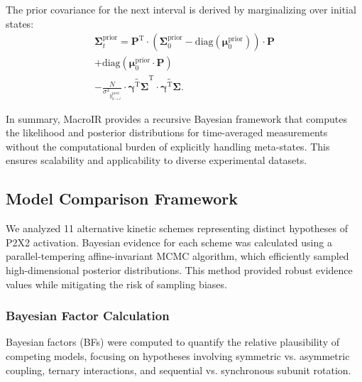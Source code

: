 \documentclass[pdflatex,sn-mathphys-num]{sn-jnl}%
\theoremstyle{thmstyleone}%
\theoremstyle{thmstyletwo}%
\theoremstyle{thmstylethree}%
\begin{document}
The prior covariance for the next interval is derived by marginalizing over initial states:
\begin{multline}
	\boldsymbol{\Sigma}^{\mathrm{prior}}_{t} = 
	\boldsymbol{P}^{\mathrm{T}} \cdot \left( \boldsymbol{\Sigma}^{\mathrm{prior}}_{0} - \mathrm{diag}(\boldsymbol{\mu}^{\mathrm{prior}}_{0}) \right) \cdot \boldsymbol{P} \\
	+ \mathrm{diag}(\boldsymbol{\mu}^{\mathrm{prior}}_{0} \cdot \boldsymbol{P}) \\
	- \frac{N}{{\sigma^2}_{\overline{y}^{\mathrm{pred}}_{0 \rightarrow t}}} \cdot
	\widetilde{\boldsymbol{\gamma}^{\mathrm{T}} \boldsymbol{\Sigma}}^{\mathrm{T}} \cdot \widetilde{\boldsymbol{\gamma}^{\mathrm{T}} \boldsymbol{\Sigma}}.
	\label{eq:prior_covariance_update_0_t}
\end{multline}

In summary, MacroIR provides a recursive Bayesian framework that computes the likelihood and posterior distributions for time-averaged measurements without the computational burden of explicitly handling meta-states. This ensures scalability and applicability to diverse experimental datasets.

\subsection{Model Comparison Framework}
We analyzed 11 alternative kinetic schemes representing distinct hypotheses of P2X2 activation. Bayesian evidence for each scheme was calculated using a parallel-tempering affine-invariant MCMC algorithm, which efficiently sampled high-dimensional posterior distributions. This method provided robust evidence values while mitigating the risk of sampling biases.


\subsubsection{Bayesian Factor Calculation}
Bayesian factors (BFs) were computed to quantify the relative plausibility of competing models, focusing on hypotheses involving symmetric vs. asymmetric coupling, ternary interactions, and sequential vs. synchronous subunit rotation.
\end{document}
